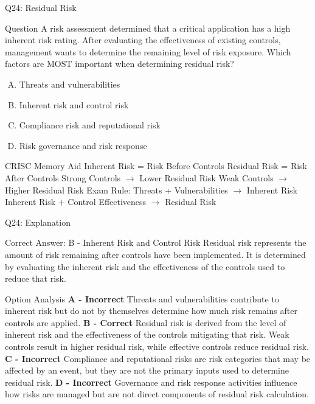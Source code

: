 \documentclass{beamer}
\begin{document}
	
	\begin{frame}{Q24: Residual Risk} \begin{block}{Question} A risk assessment determined that a critical application has a high inherent risk rating. After evaluating the effectiveness of existing controls, management wants to determine the remaining level of risk exposure. Which factors are MOST important when determining residual risk? \end{block} \begin{enumerate}[(A)] \item Threats and vulnerabilities \item Inherent risk and control risk \item Compliance risk and reputational risk \item Risk governance and risk response \end{enumerate} \begin{block}{CRISC Memory Aid} Inherent Risk = Risk Before Controls \vspace{0.1cm} Residual Risk = Risk After Controls \vspace{0.1cm} Strong Controls $\rightarrow$ Lower Residual Risk Weak Controls $\rightarrow$ Higher Residual Risk \vspace{0.15cm} Exam Rule: Threats + Vulnerabilities $\rightarrow$ Inherent Risk Inherent Risk + Control Effectiveness $\rightarrow$ Residual Risk \end{block} \end{frame} \begin{frame}[shrink=10]{Q24: Explanation} \footnotesize \begin{block}{Correct Answer: B - Inherent Risk and Control Risk} Residual risk represents the amount of risk remaining after controls have been implemented. It is determined by evaluating the inherent risk and the effectiveness of the controls used to reduce that risk. \end{block} \begin{block}{Option Analysis} \textbf{A - Incorrect} Threats and vulnerabilities contribute to inherent risk but do not by themselves determine how much risk remains after controls are applied. \vspace{0.15cm} \textbf{B - Correct} Residual risk is derived from the level of inherent risk and the effectiveness of the controls mitigating that risk. Weak controls result in higher residual risk, while effective controls reduce residual risk. \vspace{0.15cm} \textbf{C - Incorrect} Compliance and reputational risks are risk categories that may be affected by an event, but they are not the primary inputs used to determine residual risk. \vspace{0.15cm} \textbf{D - Incorrect} Governance and risk response activities influence how risks are managed but are not direct components of residual risk calculation. \end{block}  \end{frame}
	
\end{document}
